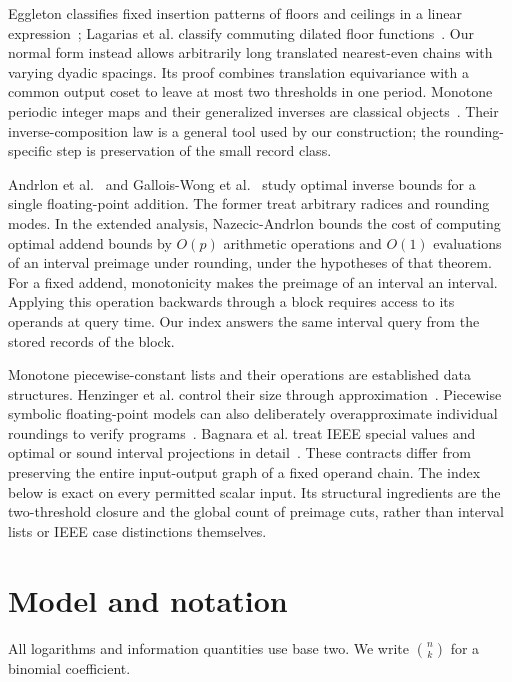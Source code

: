 \documentclass[11pt,reqno]{amsart}
\theoremstyle{definition}
\theoremstyle{remark}
\numberwithin{equation}{section}
\begin{document}
Eggleton classifies fixed insertion patterns of floors and
ceilings in a linear expression~\cite{ref24}; Lagarias et al. classify
commuting dilated floor functions~\cite{ref25}. Our normal form instead
allows arbitrarily long translated nearest-even chains with varying dyadic
spacings. Its proof combines translation equivariance with a common output
coset to leave at most two thresholds in one period.
Monotone periodic integer maps and their generalized inverses are
classical objects~\cite[Definition~2.2 and Proposition~4.1]{connesconsani2013}.
Their inverse-composition law is a general tool used by our construction;
the rounding-specific step is preservation of the small record class.

Andrlon et al.~\cite{andrlon2019} and Gallois-Wong et
al.~\cite{galloiswong2020} study optimal inverse bounds for a single
floating-point addition. The former treat arbitrary radices and rounding
modes. In the extended analysis, Nazecic-Andrlon
\cite[Theorem~4.3.23]{nazecicandrlon2023} bounds the cost of computing
optimal addend bounds by $O(p)$ arithmetic operations and $O(1)$
evaluations of an interval preimage under rounding, under the hypotheses
of that theorem. For a fixed addend, monotonicity makes the preimage of
an interval an interval. Applying this operation backwards through a
block requires access to its operands at query time. Our index answers
the same interval query from the stored records of the block.

Monotone piecewise-constant lists and their operations are established
data structures. Henzinger et al. control their size through
approximation~\cite[Section~2]{ref26}. Piecewise symbolic floating-point
models can also deliberately overapproximate individual roundings to
verify programs~\cite[Sections~4.2--4.3]{ref27}. Bagnara et al. treat
IEEE special values and optimal or sound interval projections in
detail~\cite[Sections~1.4 and~4.1--4.3]{ref28}. These contracts differ
from preserving the entire input-output graph of a fixed operand chain.
The index below is exact on every permitted scalar input. Its structural
ingredients are the two-threshold closure and the global count
of preimage cuts, rather than interval lists or IEEE case distinctions
themselves.

\section{Model and notation}\label{sec:model}

All logarithms and information quantities use base two. We write
$\binom{n}{k}$ for a binomial coefficient.
\end{document}
